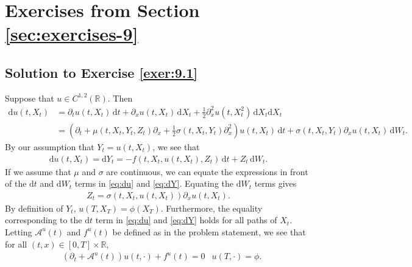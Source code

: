\documentclass[12pt]{book}
\let\varphi\phi
\numberwithin{equation}{chapter}
\theoremstyle{plain}
\numberwithin{theorem}{section}
\theoremstyle{definition}
\numberwithin{exercise}{chapter}
\newcommand{\<}{\langle}
\renewcommand{\>}{\rangle}
\renewcommand{\(}{\left(}
\renewcommand{\)}{\right)}
\renewcommand{\[}{\left[}
\renewcommand{\]}{\right]}
\newcommand\Rb{\mathds{R}}
\newcommand\Ac{\mathscr{A}}
\newcommand\sig{\sigma}
\renewcommand\d{\partial}
\newcommand\dd{\mathrm{d}}
\newcommand\half{\frac{1}{2}}
\begin{document}

\section{Exercises from Section \ref{sec:exercises-9}}

\subsection*{Solution to Exercise \ref{exer:9.1}}
Suppose that $u \in C^{1,2}(\Rb)$. Then 
\begin{align}
\dd u(t,X_t)
	&= \d_t u(t,X_t)\, \dd t
	+ \d_x u(t,X_t)\, \dd X_t 
	+ \half \d_x^2 u(t,X_t^2)\, \dd X_t \dd X_t \\
	&= \( \d_t + \mu(t,X_t,Y_t,Z_t) \d_x + \half \sig(t,X_t,Y_t) \d_x^2 \) u(t,X_t)\, \dd t
	+ \sig(t,X_t,Y_t) \d_x u(t,X_t)\, \dd W_t. \label{eq:du}
\end{align}
By our assumption that $Y_t = u(t,X_t)$, we see that 
\begin{align}
\dd u(t,X_t)
	=\dd Y_t
	= - f(t,X_t,u(t,X_t),Z_t)\, \dd t + Z_t\, \dd W_t. \label{eq:dY}
\end{align}
If we assume that $\mu$ and $\sig$ are continuous, we can equate the expressions in front of the $\dd t$ and $\dd W_t$ terms in \eqref{eq:du} and \eqref{eq:dY}. Equating the $\dd W_t$ terms gives
\begin{align}
Z_t
	= \sig( t,X_t, u(t,X_t)) \d_x u(t,X_t). \label{eq:Z}
\end{align}
By definition of $Y_t$, $u(T,X_T) = \varphi(X_T)$. Furthermore, the equality corresponding to the $\dd t$ term in \eqref{eq:du} and \eqref{eq:dY} holds for all paths of $X_t$. Letting $\Ac^u(t)$ and $f^u(t)$ be defined as in the problem statement, we see that for all $(t,x) \in [0,T] \times \Rb$, 
\begin{align}
&(\d_t + \Ac^u(t) ) u(t,\cdot) + f^u (t)
	= 0
& u(T,\cdot)
	= \varphi.
\end{align}
\end{document}
